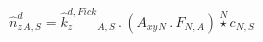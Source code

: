 \documentclass[border=2pt]{standalone}
\begin{document}
${{\hat{n}^{d}_z}}{_{A, S}}={{\hat{k}^{d,Fick}_z}}{_{A, S}} \, . \, \left({{A_{xy}}}{_{N}} \, . \, {{F}}{_{N, A}}\right) \stackrel{N}{\star} {c}{_{N, S}}$
\end{document}
